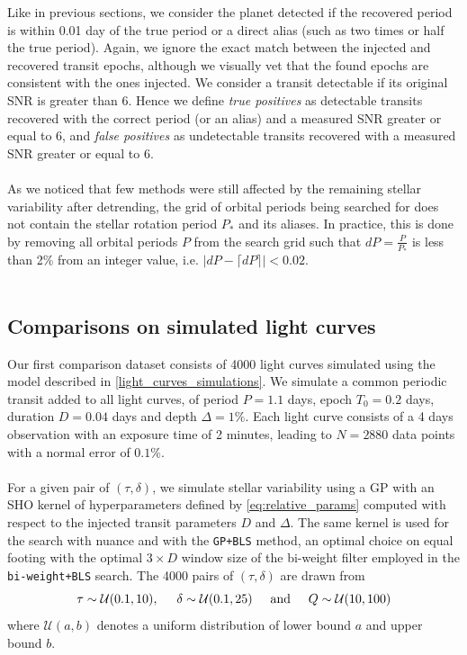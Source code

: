 \documentclass[modern,linenumbers]{aastex631}
\newcommand{\wtls}{\texttt{bi-weight+BLS}}
\begin{document}
Like in previous sections, we consider the planet detected if the recovered period is within 0.01 day of the true period or a direct alias (such as two times or half the true period). Again, we ignore the exact match between the injected and recovered transit epochs, although we visually vet that the found epochs are consistent with the ones injected. We consider a transit detectable if its original SNR is greater than 6. Hence we define \textit{true positives} as detectable transits recovered with the correct period (or an alias) and a measured SNR greater or equal to 6, and \textit{false positives} as undetectable transits recovered with a measured SNR greater or equal to 6.\\\\As we noticed that few methods were still affected by the remaining stellar variability after detrending, the grid of orbital periods being searched for does not contain the stellar rotation period $P_*$ and its aliases. In practice, this is done by removing all orbital periods $P$ from the search grid such that $dP = \frac{P}{P_*}$ is less than 2\% from an integer value, i.e. $\vert  dP - \lceil dP \rceil \vert < 0.02$.\\\\
\subsection{Comparisons on simulated light curves}\label{simu}
Our first comparison dataset consists of 4000 light curves simulated using the model described in \autoref{light_curves_simulations}. We simulate a common periodic transit added to all light curves, of period $P=1.1$ days, epoch $T_0=0.2$ days, duration $D=0.04$ days and depth $\Delta=1\%$. Each light curve consists of a 4 days observation with an exposure time of 2 minutes, leading to $N=2880$ data points with a normal error of $0.1\%$.\\\\
For a given pair of $(\tau, \delta)$, we simulate stellar variability using a GP with an SHO kernel of hyperparameters defined by \autoref{eq:relative_params} computed with respect to the injected transit parameters $D$ and $\Delta$. The same kernel is used for the search with \textsf{nuance} and with the \texttt{GP+BLS} method, an optimal choice on equal footing with the optimal $3\times D$ window size of the bi-weight filter employed in the \wtls{} search.
The 4000 pairs of $(\tau, \delta)$ are drawn from
\begin{equation*}
    \tau \sim \mathcal{U}(0.1, 10), \hspace{0.5cm} \delta \sim \mathcal{U}(0.1, 25) \hspace{0.5cm}\text{and}\hspace{0.5cm} Q \sim \mathcal{U}(10, 100)
\end{equation*}
where $\mathcal{U}(a, b)$ denotes a uniform distribution of lower bound $a$ and upper bound $b$.\\\\
\end{document}
